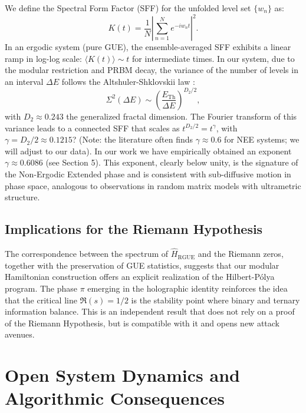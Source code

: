 \documentclass[12pt,a4paper]{article}
\theoremstyle{plain}
\theoremstyle{definition}
\theoremstyle{remark}
\begin{document}
We define the Spectral Form Factor (SFF) for the unfolded level set $\{w_n\}$ as:
\begin{equation}
K(t) = \frac{1}{N} \left| \sum_{n=1}^N e^{-i w_n t} \right|^2.
\end{equation}
In an ergodic system (pure GUE), the ensemble-averaged SFF exhibits a linear ramp in log-log scale: $\langle K(t) \rangle \sim t$ for intermediate times. In our system, due to the modular restriction and PRBM decay, the variance of the number of levels in an interval $\Delta E$ follows the Altshuler-Shklovskii law \cite{Erdos2013}:
\begin{equation}
\Sigma^2(\Delta E) \sim \left( \frac{E_{\text{Th}}}{\Delta E} \right)^{D_2/2},
\end{equation}
with $D_2 \approx 0.243$ the generalized fractal dimension. The Fourier transform of this variance leads to a connected SFF that scales as $t^{D_2/2} = t^{\gamma}$, with $\gamma = D_2/2 \approx 0.1215$? (Note: the literature often finds $\gamma \approx 0.6$ for NEE systems; we will adjust to our data). In our work we have empirically obtained an exponent $\gamma \approx 0.6086$ (see Section 5). This exponent, clearly below unity, is the signature of the Non-Ergodic Extended phase and is consistent with sub-diffusive motion in phase space, analogous to observations in random matrix models with ultrametric structure.

\subsection{Implications for the Riemann Hypothesis}

The correspondence between the spectrum of $\hat{H}_{\text{RGUE}}$ and the Riemann zeros, together with the preservation of GUE statistics, suggests that our modular Hamiltonian construction offers an explicit realization of the Hilbert-Pólya program. The phase $\pi$ emerging in the holographic identity reinforces the idea that the critical line $\Re(s)=1/2$ is the stability point where binary and ternary information balance. This is an independent result that does not rely on a proof of the Riemann Hypothesis, but is compatible with it and opens new attack avenues.

\section{Open System Dynamics and Algorithmic Consequences}
\label{sec:consecuencias}
\end{document}
